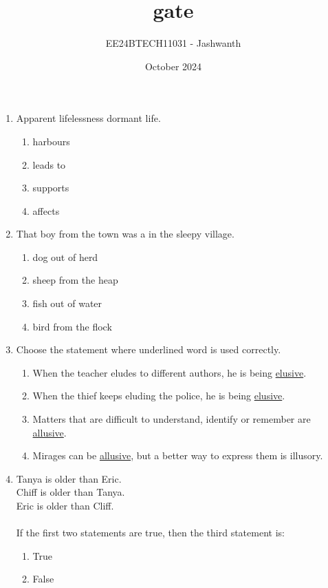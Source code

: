 \documentclass[journal,12pt,onecolumn]{IEEEtran}
\title{gate}
\author{EE24BTECH11031 - Jashwanth}
\date{October 2024}
\theoremstyle{remark}
\begin{document}
\maketitle

\begin{enumerate}
    \item Apparent lifelessness \underline{\phantom{black}} dormant life.
    \begin{enumerate}
        \item harbours
        \item leads to
        \item supports
        \item affects
    \end{enumerate}
    \item That boy from the town was a \underline{\phantom{black}} in the sleepy village.
    \begin{enumerate}
    \item dog out of herd
    \item sheep from the heap
    \item fish out of water
    \item bird from the flock
    \end{enumerate}
    \item Choose the statement where underlined word is used correctly.
    \begin{enumerate}
        \item When the teacher eludes to different authors, he is being \underline{elusive}.
        \item When the thief keeps eluding the police, he is being \underline{elusive}.
        \item Matters that are difficult to understand, identify or remember are \underline{allusive}.
        \item Mirages can be \underline{allusive}, but a better way to express them is illusory.
    \end{enumerate}
    \item Tanya is older than Eric.\\Chiff is older than Tanya.\\Eric is older than Cliff.\\\\
    If the first two statements are true, then the third statement is:
    \begin{enumerate}
        \item True
        \item False

\end{enumerate}
\end{enumerate}
\end{document}
